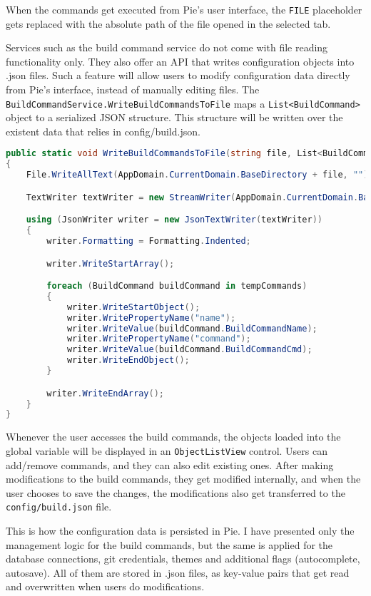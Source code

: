 When the commands get executed from Pie's user interface, the \texttt{\textdollar{}FILE} placeholder gets replaced with the absolute path of the file opened in the selected tab.

Services such as the build command service do not come with file reading functionality only. They also offer an API that writes configuration objects into .json files. Such a feature will allow users to modify configuration data directly from Pie's interface, instead of manually editing files. The \texttt{BuildCommandService.WriteBuildCommandsToFile} maps a \texttt{List<BuildCommand>} object to a serialized JSON structure. This structure will be written over the existent data that relies in config/build.json.

\begin{lstlisting}[language=csharp, caption={Serializing build command configuration data into a JSON structure}]
public static void WriteBuildCommandsToFile(string file, List<BuildCommand> tempCommands)
{
    File.WriteAllText(AppDomain.CurrentDomain.BaseDirectory + file, "");

    TextWriter textWriter = new StreamWriter(AppDomain.CurrentDomain.BaseDirectory + file);

    using (JsonWriter writer = new JsonTextWriter(textWriter))
    {
        writer.Formatting = Formatting.Indented;

        writer.WriteStartArray();

        foreach (BuildCommand buildCommand in tempCommands)
        {
            writer.WriteStartObject();
            writer.WritePropertyName("name");
            writer.WriteValue(buildCommand.BuildCommandName);                    
            writer.WritePropertyName("command");
            writer.WriteValue(buildCommand.BuildCommandCmd);
            writer.WriteEndObject();
        }

        writer.WriteEndArray();
    }
}
\end{lstlisting}

Whenever the user accesses the build commands, the objects loaded into the global variable will be displayed in an \texttt{ObjectListView} control. Users can add/remove commands, and they can also edit existing ones. After making modifications to the build commands, they get modified internally, and when the user chooses to save the changes, the modifications also get transferred to the \texttt{config/build.json} file.

This is how the configuration data is persisted in Pie. I have presented only the management logic for the build commands, but the same is applied for the database connections, git credentials, themes and additional flags (autocomplete, autosave). All of them are stored in .json files, as key-value pairs that get read and overwritten when users do modifications.

